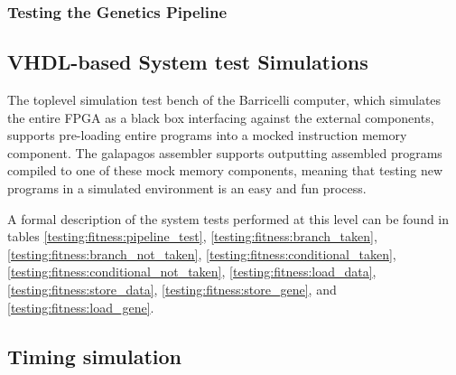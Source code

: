 
\subsubsection{Testing the Genetics Pipeline}


\subsection{\gls{VHDL}-based System test Simulations}
\label{section:testing:fpga:system-tests}

The toplevel simulation test bench of the Barricelli computer, which simulates the entire FPGA as a black box interfacing against the external components, supports pre-loading entire programs into a mocked instruction memory component.
The \Gls{galapagos assembler} supports outputting assembled programs compiled to one of these mock memory components, meaning that testing new programs in a simulated environment is an easy and fun process.


A formal description of the system tests performed at this level can be found in tables
\ref{testing:fitness:pipeline_test},
\ref{testing:fitness:branch_taken},
\ref{testing:fitness:branch_not_taken},
\ref{testing:fitness:conditional_taken},
\ref{testing:fitness:conditional_not_taken},
\ref{testing:fitness:load_data},
\ref{testing:fitness:store_data},
\ref{testing:fitness:store_gene},
and
\ref{testing:fitness:load_gene}.














\subsection{Timing simulation}






